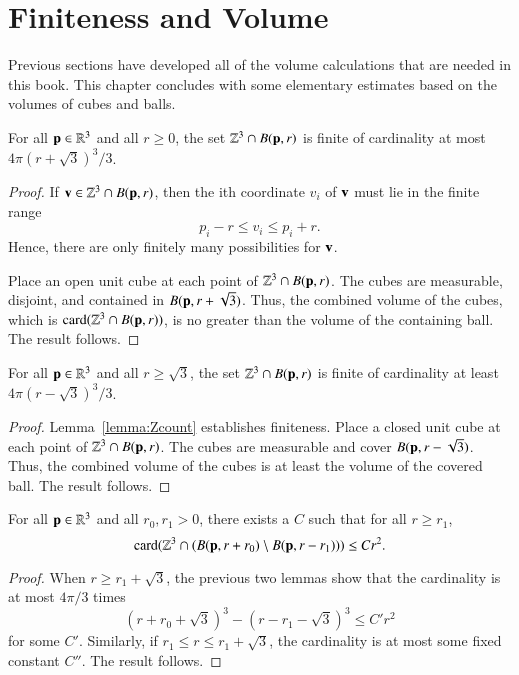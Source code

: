 \section{Finiteness and Volume}\label{sec:finiteness}

Previous sections have developed all of the volume calculations that are
 needed in this book.  This chapter concludes with some 
elementary estimates based on the volumes of  cubes and balls.

\begin{lemma}[]
\label{lemma:Zcount}
For all ${\mathbf p}\in\mathbb{R}^3$ and all $r\ge 0$, the set
$\mathbb{Z}^3\cap B({\mathbf p},r)$ is finite of cardinality at most
$4\pi (r+\sqrt3)^3/3$.
%
\end{lemma}

\begin{proof}  If ${\mathbf v}\in\mathbb{Z}^3\cap B({\mathbf p},r)$, then the ith
coordinate $v_i$ of ${\mathbf v}$ must lie in the finite range
\[ 
p_i - r \le v_i \le p_i + r.
\] 
Hence, there are only finitely many possibilities for ${\mathbf v}$.


Place an open unit cube at each point of $\mathbb{Z}^3\cap B({\mathbf p},r)$.
The cubes are measurable, disjoint, and contained in
$B({\mathbf p},r+\sqrt3)$.  Thus, the combined volume of the cubes, which is
${\operatorname{card}}(\mathbb{Z}^3\cap B({\mathbf p},r))$,  is no greater than the volume of the
containing ball.  The result follows.
\end{proof}

\begin{lemma}[]
\label{lemma:Zlow-count}
For all ${\mathbf p}\in\mathbb{R}^3$ and all $r\ge\sqrt3$, the set
$\mathbb{Z}^3\cap B({\mathbf p},r)$ is finite of cardinality at least
$4\pi (r-\sqrt3)^3/3$.
\end{lemma}

\begin{proof} Lemma~\ref{lemma:Zcount} establishes finiteness.  Place
a closed unit cube at each point of $\mathbb{Z}^3\cap B({\mathbf p},r)$.  The
cubes are measurable and cover $B({\mathbf p},r-\sqrt3)$.  Thus, the combined
volume of the cubes is at least the volume of the covered ball.  The
result follows.
\end{proof}

\begin{lemma}
\label{lemma:Zr2}
For all ${\mathbf p}\in\mathbb{R}^3$ and all $r_0,r_1>0$, there exists a $C$ such
that for all $r\ge r_1$, 
\[ 
{\operatorname{card}}(\mathbb{Z}^3 \cap (B({\mathbf p},r+r_0) \setminus B({\mathbf p},r-r_1))) \le C r^2.
\] 
\end{lemma}

\begin{proof}  When $r \ge r_1+\sqrt3$, the previous two lemmas show
that the cardinality is at most $4\pi/3$ times
\[ 
(r +r_0 + \sqrt3)^3 - (r - r_1 - \sqrt3)^3 \le C' r^2
\] 
for some $C'$.  Similarly, if $r_1\le r\le r_1+\sqrt3$, the
cardinality is at most some fixed constant $C''$.  The result
 follows.
\end{proof}

